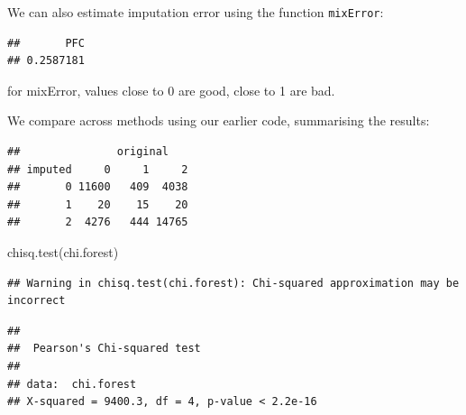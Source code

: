 \documentclass[
]{book}
\newenvironment{Shaded}{\begin{snugshade}}{\end{snugshade}}
\newcommand{\AttributeTok}[1]{\textcolor[rgb]{0.77,0.63,0.00}{#1}}
\newcommand{\FloatTok}[1]{\textcolor[rgb]{0.00,0.00,0.81}{#1}}
\newcommand{\FunctionTok}[1]{\textcolor[rgb]{0.00,0.00,0.00}{#1}}
\newcommand{\NormalTok}[1]{#1}
\newcommand{\OtherTok}[1]{\textcolor[rgb]{0.56,0.35,0.01}{#1}}
\newcommand{\SpecialCharTok}[1]{\textcolor[rgb]{0.00,0.00,0.00}{#1}}
\newcommand{\StringTok}[1]{\textcolor[rgb]{0.31,0.60,0.02}{#1}}
\begin{document}
We can also estimate imputation error using the function \texttt{mixError}:

\begin{Shaded}
\end{Shaded}

\begin{verbatim}
##       PFC 
## 0.2587181
\end{verbatim}

for mixError, values close to 0 are good, close to 1 are bad.

We compare across methods using our earlier code, summarising the results:

\begin{Shaded}
\end{Shaded}

\begin{verbatim}
##               original
## imputed     0     1     2
##       0 11600   409  4038
##       1    20    15    20
##       2  4276   444 14765
\end{verbatim}

\begin{Shaded}
\begin{Highlighting}[]
\FunctionTok{chisq.test}\NormalTok{(chi.forest)}
\end{Highlighting}
\end{Shaded}

\begin{verbatim}
## Warning in chisq.test(chi.forest): Chi-squared approximation may be incorrect
\end{verbatim}

\begin{verbatim}
## 
##  Pearson's Chi-squared test
## 
## data:  chi.forest
## X-squared = 9400.3, df = 4, p-value < 2.2e-16
\end{verbatim}
\end{document}

